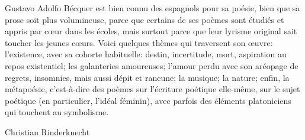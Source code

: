 \documentclass[a4paper,fontsize=13pt,twoside,final]{scrbook}
\begin{document}
Gustavo Adolfo Bécquer est bien connu des espagnols pour sa poésie,
bien que sa prose soit plus volumineuse, parce que certains de ses
poèmes sont étudiés et appris par cœur dans les écoles, mais surtout
parce que leur lyrisme original sait toucher les jeunes cœurs. Voici
quelques thèmes qui traversent son œuvre: l'existence, avec sa cohorte
habituelle: destin, incertitude, mort, aspiration au repos
existentiel; les galanteries amoureuses; l'amour perdu avec son
aréopage de regrets, insomnies, mais aussi dépit et rancune; la
musique; la nature; enfin, la métapoésie, c'est-à-dire des poèmes sur
l'écriture poétique elle-même, sur le sujet poétique (en particulier,
l'idéal féminin), avec parfois des éléments platoniciens qui touchent
au symbolisme.

\bigskip
\bigskip
\bigskip
\bigskip
\hfill Christian Rinderknecht
\end{document}
